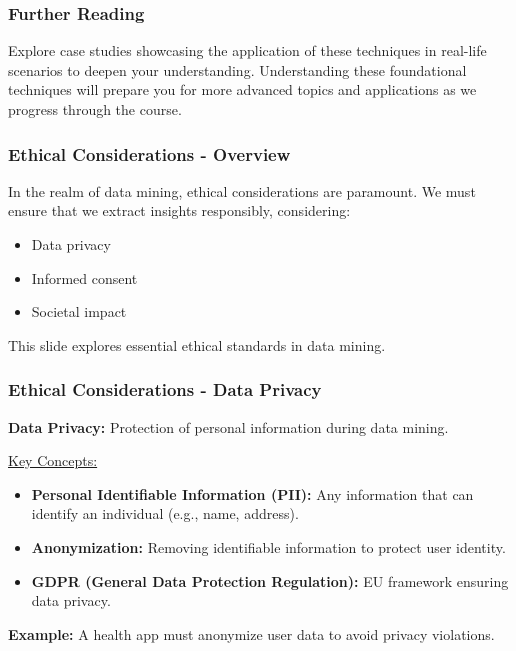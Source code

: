 \documentclass[aspectratio=169]{beamer}
\begin{document}
\begin{frame}[fragile]
    \frametitle{Further Reading}
    Explore case studies showcasing the application of these techniques in real-life scenarios to deepen your understanding. Understanding these foundational techniques will prepare you for more advanced topics and applications as we progress through the course.
\end{frame}

\begin{frame}[fragile]
    \frametitle{Ethical Considerations - Overview}
    In the realm of data mining, ethical considerations are paramount. 
    We must ensure that we extract insights responsibly, considering:
    \begin{itemize}
        \item Data privacy
        \item Informed consent
        \item Societal impact
    \end{itemize}
    This slide explores essential ethical standards in data mining.
\end{frame}

\begin{frame}[fragile]
    \frametitle{Ethical Considerations - Data Privacy}
    \textbf{Data Privacy:} Protection of personal information during data mining.
    
    \underline{Key Concepts:}
    \begin{itemize}
        \item \textbf{Personal Identifiable Information (PII):} Any information that can identify an individual (e.g., name, address).
        \item \textbf{Anonymization:} Removing identifiable information to protect user identity.
        \item \textbf{GDPR (General Data Protection Regulation):} EU framework ensuring data privacy.
    \end{itemize}

    \textbf{Example:} A health app must anonymize user data to avoid privacy violations.
\end{frame}
\end{document}

